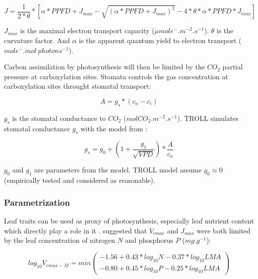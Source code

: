 \documentclass[12pt,]{article}
\theoremstyle{definition}
\theoremstyle{definition}
\theoremstyle{remark}
\begin{document}
\begin{equation}
  J = \frac{1}{2*\theta}*[\alpha*PPFD+J_{max}-\sqrt{(\alpha*PPFD+J_{max})^2}-4*\theta*\alpha*PPFD*J_{max}]
  \label{eq:J}
\end{equation}

\(J_{max}\) is the maximal electron transport capacity
(\(\mu mol e^-.m^{-2}.s^{-1}\)). \(\theta\) is the curvature factor. And
\(\alpha\) is the apparent quantum yield to electron transport
(\(mole^-.mol~photons^{-1}\)).

Carbon assimilation by photosynthesis will then be limited by the
\(CO_2\) partial pressure at carboxylation sites. Stomata controls the
gas concentration at carboxylation sites throught stomatal transport:

\begin{equation}
  A = g_s*(c_a-c_i)
  \label{eq:Ag}
\end{equation}

\(g_s\) is the stomatal conductance to \(CO_2\)
(\(molCO_2.m^{-2}.s^{-1}\)). TROLL simulates stomatal conductance
\(g_s\) with the model from \citep{Medlyn2011}:

\begin{equation}
  g_s = g_0 + (1 + \frac{g_1}{\sqrt{VPD}})*\frac{A}{c_a}
  \label{eq:gs}
\end{equation}

\(g_0\) and \(g_1\) are parameters from the model. TROLL model assume
\(g_0 \approx 0\) (empirically tested and considered as reasonable).

\subsubsection{Parametrization}\label{parametrization}

Leaf traits can be used as proxy of photosynthesis, especially leaf
nutrient content which directly play a role in it
\citep{wright_worldwide_2004}. \citet{Domingues2010} suggested that
\(V_{cmac}\) and \(J_{max}\) were both limited by the leaf concentration
of nitrogen \(N\) and phosphorus \(P\) (\(mg.g^{-1}\)):

\begin{equation}
  log_{10} V_{cmax-M} = min( 
  \begin{array}{c} 
    -1.56+0.43*log_{10} N-0.37*log_{10} LMA \\
    -0.80+0.45*log_{10} P-0.25*log_{10} LMA 
  \end{array} 
  )
  \label{eq:VcmaxM}
\end{equation}
\end{document}
